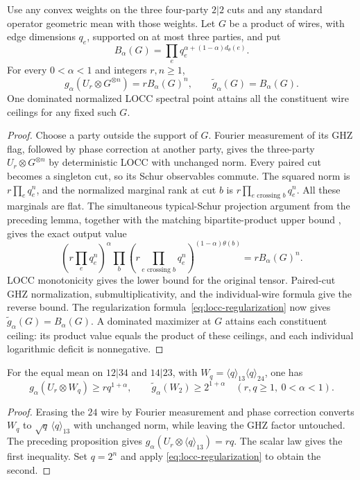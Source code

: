 \begin{proposition}
\label{prop:three-party-graph-locc}
Use any convex weights on the three four-party $2|2$ cuts and any
standard operator geometric mean with those weights. Let $G$ be a
product of wires, with edge dimensions $q_e$, supported on at most
three parties, and put
\[
 B_\alpha(G)=\prod_{e}q_e^{\alpha+(1-\alpha)d_\theta(e)}.
\]
For every $0<\alpha<1$ and integers $r,n\geq1$,
\begin{equation}\label{eq:three-party-graph-locc}
 g_\alpha(U_r\otimes G^{\otimes n})=r B_\alpha(G)^n,
 \qquad \widetilde g_\alpha(G)=B_\alpha(G).
\end{equation}
One dominated normalized LOCC spectral point attains all the
constituent wire ceilings for any fixed such $G$.
\end{proposition}
\begin{proof}
Choose a party outside the support of $G$. Fourier measurement of
its GHZ flag, followed by phase correction at another party, gives
the three-party $U_r\otimes G^{\otimes n}$ by deterministic LOCC
with unchanged norm. Every paired cut becomes a singleton cut, so
its Schur observables commute. The squared norm is
$r\prod_e q_e^n$, and the normalized marginal rank at cut $b$ is
$r\prod_{e\text{ crossing }b}q_e^n$. All these marginals are flat.
The simultaneous typical-Schur projection argument from the preceding
lemma, together with the matching bipartite-product upper bound
\cite[Proposition~5.1]{BugarVrana2025}, gives the exact output value
\[
 \left(r\prod_e q_e^n\right)^\alpha
 \prod_b\left(r\prod_{e\text{ crossing }b}q_e^n
         \right)^{(1-\alpha)\theta(b)}
 =r B_\alpha(G)^n.
\]
LOCC monotonicity gives the lower bound for the original tensor.
Paired-cut GHZ normalization, submultiplicativity, and the
individual-wire formula give the reverse bound.
The regularization formula~\eqref{eq:locc-regularization} now gives
$\widetilde g_\alpha(G)=B_\alpha(G)$.
A dominated maximizer at $G$ attains each constituent ceiling:
its product value equals the product of these ceilings, and each
individual logarithmic deficit is nonnegative.
\end{proof}

\begin{corollary}
\label{cor:binary-uniform-baseline}
For the equal mean on $12|34$ and $14|23$, with
$W_q=\langle q\rangle_{13}\langle q\rangle_{24}$, one has
\begin{equation}\label{eq:binary-uniform-baseline}
 g_\alpha(U_r\otimes W_q)\geq r q^{1+\alpha},
 \qquad
 \widetilde g_\alpha(W_2)\geq2^{1+\alpha}
 \quad(r,q\geq1,\ 0<\alpha<1).
\end{equation}
\end{corollary}
\begin{proof}
Erasing the $24$ wire by Fourier measurement and phase correction
converts $W_q$ to $\sqrt q\,\langle q\rangle_{13}$ with unchanged
norm, while leaving the GHZ factor untouched. The preceding
proposition gives
$g_\alpha(U_r\otimes\langle q\rangle_{13})=rq$.
The scalar law gives the first inequality. Set $q=2^n$ and apply
\eqref{eq:locc-regularization} to obtain the second.
\end{proof}

